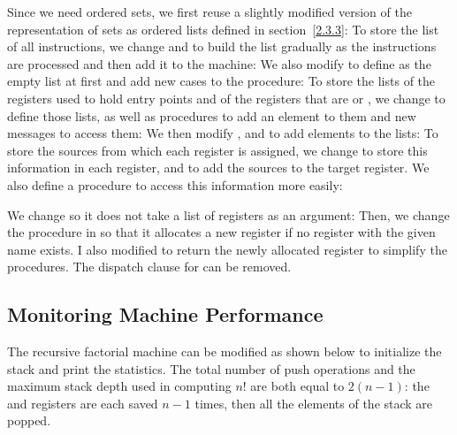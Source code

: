 \begin{exe}[5.12]
    \label{5.12}
    Since we need ordered sets, we first reuse a slightly modified version of 
    the representation of sets as ordered lists defined in section~\ref{2.3.3}:
    To store the list of all instructions, we change  and 
     to build the list gradually as the instructions are 
    processed and then add it to the machine:
    We also modify  to define  as 
    the empty list at first and add new cases to the  procedure:
    To store the lists of the registers used to hold entry points and of the 
    registers that are  or , we change 
     to define those lists, as well as procedures to add 
    an element to them and new messages to access them:
    We then modify ,  and  to 
    add elements to the lists:
    To store the sources from which each register is assigned, we change 
     to store this information in each register, and 
     to add the sources to the target register. We also define 
    a  procedure to access this information more easily:
\end{exe}

\begin{exe}[5.13]
    We change  so it does not take a list of registers as an 
    argument:
    Then, we change the  procedure in 
     so that it allocates a new register if no register 
    with the given name exists. I also modified  to 
    return the newly allocated register to simplify the procedures. The dispatch 
    clause for  can be removed.
\end{exe}

\subsection{Monitoring Machine Performance}

\begin{exe}[5.14]
    The recursive factorial machine can be modified as shown below to initialize 
    the stack and print the statistics.
    The total number of push operations and the maximum stack depth used in 
    computing $n!$ are both equal to $2 (n - 1)$: the  and 
     registers are each saved $n - 1$ times, then all the 
    elements of the stack are popped.
\end{exe}

